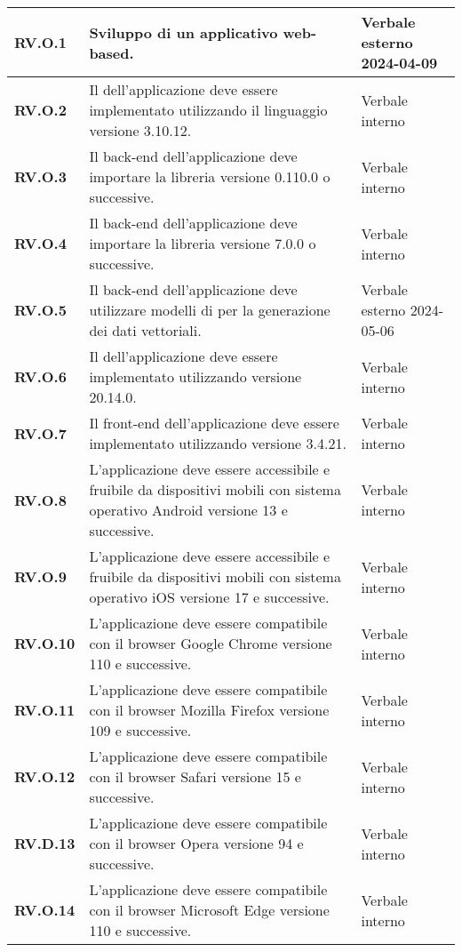 \begin{adjustwidth}{-0.5cm}{-0.5cm}
\begin{longtable}{|P{3cm}|P{6,5cm}|>{\arraybackslash}P{4cm}|}
    \textbf{RV.O.1} & Sviluppo di un applicativo web-based. & Verbale esterno 2024-04-09 \\
    \hline
    \textbf{RV.O.2} & Il  dell'applicazione deve essere implementato utilizzando il linguaggio  versione 3.10.12. & Verbale interno \\
    \hline
    \textbf{RV.O.3} & Il back-end dell'applicazione deve importare la libreria  versione 0.110.0 o successive. & Verbale interno \\
    \hline
    \textbf{RV.O.4} & Il back-end dell'applicazione deve importare la libreria  versione 7.0.0 o successive. & Verbale interno \\
    \hline
    \textbf{RV.O.5} & Il back-end dell'applicazione deve utilizzare modelli di  per la generazione dei dati vettoriali. & Verbale esterno 2024-05-06 \\
    \hline
    \textbf{RV.O.6} & Il  dell'applicazione deve essere implementato utilizzando  versione 20.14.0. & Verbale interno \\
    \hline
    \textbf{RV.O.7} & Il front-end dell'applicazione deve essere implementato utilizzando  versione 3.4.21. & Verbale interno \\
    \hline
    \textbf{RV.O.8} & L'applicazione deve essere accessibile e fruibile da dispositivi mobili con sistema operativo Android versione 13 e successive. & Verbale interno \\
    \hline
    \textbf{RV.O.9} & L'applicazione deve essere accessibile e fruibile da dispositivi mobili con sistema operativo iOS versione 17 e successive. & Verbale interno \\
    \hline
    \textbf{RV.O.10} & L'applicazione deve essere compatibile con il browser Google Chrome versione 110 e successive. & Verbale interno \\
    \hline
    \textbf{RV.O.11} & L'applicazione deve essere compatibile con il browser Mozilla Firefox versione 109 e successive. & Verbale interno \\
    \hline
    \textbf{RV.O.12} & L'applicazione deve essere compatibile con il browser Safari versione 15 e successive. & Verbale interno \\
    \hline
    \textbf{RV.D.13} & L'applicazione deve essere compatibile con il browser Opera versione 94 e successive. & Verbale interno \\
    \hline
    \textbf{RV.O.14} & L'applicazione deve essere compatibile con il browser Microsoft Edge versione 110 e successive. & Verbale interno \\

\end{longtable}
\end{adjustwidth}
